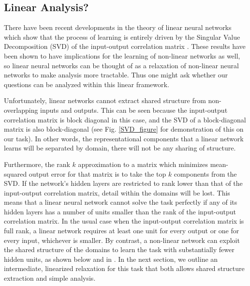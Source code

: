 \documentclass[10pt,letterpaper]{article}
\begin{document}
\subsection{Linear Analysis?}
There have been recent developments in the theory of linear neural networks which show that the process of learning is entirely driven by the Singular Value Decomposition (SVD) of the input-output correlation matrix \cite{Saxe2013}. These results have been shown to have implications for the learning of non-linear networks as well, so linear neural networks can be thought of as a relaxation of non-linear neural networks to make analysis more tractable. Thus one might ask whether our questions can be analyzed within this linear framework. \par
Unfortunately, linear networks cannot extract shared structure from non-overlapping inputs and outputs. This can be seen because the input-output correlation matrix is block diagonal in this case, and the SVD of a block-diagonal matrix is also block-diagonal (see Fig. \ref{SVD_figure} for demonstration of this on our task). In other words, the representational components that a linear network learns will be separated by domain, there will not be any sharing of structure.\par 
Furthermore, the rank $k$ approximation to a matrix which minimizes mean-squared output error for that matrix is to take the top $k$ components from the SVD. If the network's hidden layers are restricted to rank lower than that of the input-output correlation matrix, detail within the domains will be lost. This means that a linear neural network cannot solve the task perfectly if any of its hidden layers has a number of units smaller than the rank of the input-output correlation matrix. In the usual case when the input-output correlation matrix is full rank, a linear network requires at least one unit for every output or one for every input, whichever is smaller. By contrast, a non-linear network can exploit the shared structure of the domains to learn the task with substantially fewer hidden units, as shown below and in \cite{Hinton1986}. In the next section, we outline an intermediate, linearized relaxation for this task that both allows shared structure extraction and simple analysis. 
\end{document}
